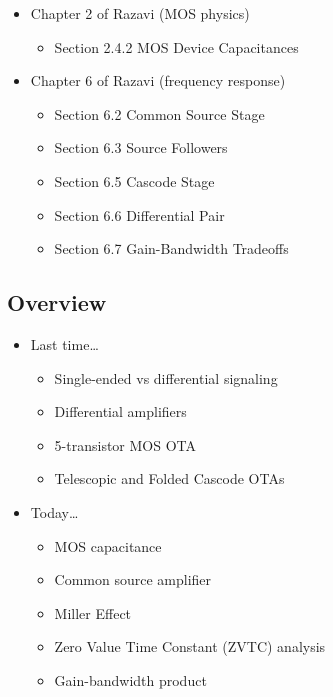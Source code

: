 \documentclass[11pt]{article}
\providecommand{\tightlist}{%
      \setlength{\itemsep}{0pt}\setlength{\parskip}{0pt}}
\begin{document}
    \begin{itemize}
\tightlist
\item
  Chapter 2 of Razavi (MOS physics)

  \begin{itemize}
  \tightlist
  \item
    Section 2.4.2 MOS Device Capacitances
  \end{itemize}
\item
  Chapter 6 of Razavi (frequency response)

  \begin{itemize}
  \tightlist
  \item
    Section 6.2 Common Source Stage
  \item
    Section 6.3 Source Followers
  \item
    Section 6.5 Cascode Stage
  \item
    Section 6.6 Differential Pair
  \item
    Section 6.7 Gain-Bandwidth Tradeoffs
  \end{itemize}
\end{itemize}

    \hypertarget{overview}{%
\subsection{Overview}\label{overview}}

    \begin{itemize}
\tightlist
\item
  Last time\ldots{}

  \begin{itemize}
  \tightlist
  \item
    Single-ended vs differential signaling
  \item
    Differential amplifiers
  \item
    5-transistor MOS OTA
  \item
    Telescopic and Folded Cascode OTAs
  \end{itemize}
\item
  Today\ldots{}

  \begin{itemize}
  \tightlist
  \item
    MOS capacitance
  \item
    Common source amplifier
  \item
    Miller Effect
  \item
    Zero Value Time Constant (ZVTC) analysis
  \item
    Gain-bandwidth product
  \end{itemize}
\end{itemize}
\end{document}
